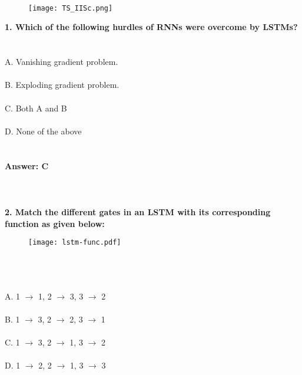 \documentclass[prl,twocolumn,showpacs,preprintnumbers,superscriptaddress]{revtex4}
\theoremstyle{plain}
\theoremstyle{definition}
\begin{document}
\begin{widetext}
\\
\\
\\

\begin{wrapfigure}
\centering
\end{wrapfigure}
\begin{figure}[h!]
 \begin{right}
  \hfill\texttt{[image: TS\_IISc.png]}
 \end{right}
\end{figure}
\noindent\textbf{1. Which of the following hurdles of RNNs were overcome by LSTMs?}
\\
\\
\\
A. Vanishing gradient problem.
\\
\\
B. Exploding gradient problem.
\\
\\
C. Both A and B
\\
\\
D. None of the above
\\
\\
\\
\textbf{Answer: C}
\\
\\
\\
\\
\textbf{2. Match the different gates in an LSTM with its corresponding function as given below:}
\begin{figure}[H]
\begin{center}
    \texttt{[image: lstm-func.pdf]}
\end{center}
\end{figure}
\\
\\
\\
\noindent A. 1 $\rightarrow$ 1, 2 $\rightarrow$ 3, 3 $\rightarrow$ 2
\\
\\
B. 1 $\rightarrow$ 3, 2 $\rightarrow$ 2, 3 $\rightarrow$ 1
\\
\\
C. 1 $\rightarrow$ 3, 2 $\rightarrow$ 1, 3 $\rightarrow$ 2
\\
\\
D. 1 $\rightarrow$ 2, 2 $\rightarrow$ 1, 3 $\rightarrow$ 3
\\

\end{widetext}
\end{document}

